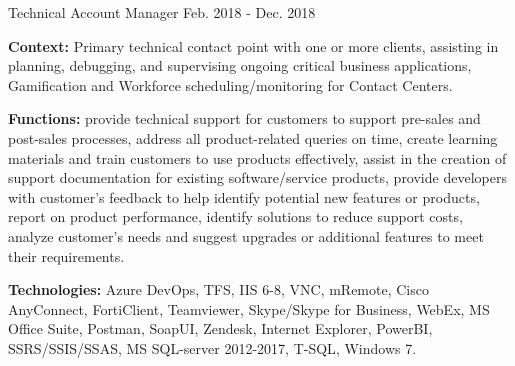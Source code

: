 \begin{cventries}
  \cventry
    {Technical Account Manager} %
    {} %
    {} %
    {Feb. 2018 - Dec. 2018} %
    {
      \begin{cvitems} %
		\item[] {\textbf{Context:} Primary technical contact point with one or more clients, assisting in planning, debugging, and supervising ongoing critical business applications, Gamification and Workforce scheduling/monitoring for Contact Centers.}
		\item[] {\textbf{Functions:} provide technical support for customers to support pre-sales and post-sales processes, address all product-related queries on time, create learning materials and train customers to use products effectively, assist in the creation of support documentation for existing software/service products, provide developers with customer's feedback to help identify potential new features or products, report on product performance, identify solutions to reduce support costs, analyze customer's needs and suggest upgrades or additional features to meet their requirements.}		
		\item[] {\textbf{Technologies:} \textcolor{rainbowcolor-olive}{Azure DevOps}, \textcolor{rainbowcolor-olive}{TFS}, \textcolor{rainbowcolor-olive}{IIS 6-8}, \textcolor{rainbowcolor-olive}{VNC}, \textcolor{rainbowcolor-olive}{mRemote}, \textcolor{rainbowcolor-olive}{Cisco AnyConnect}, %
\textcolor{rainbowcolor-olive}{FortiClient}, \textcolor{rainbowcolor-olive}{Teamviewer}, \textcolor{rainbowcolor-olive}{Skype/Skype for Business}, \textcolor{rainbowcolor-olive}{WebEx}, \textcolor{rainbowcolor-olive}{MS Office Suite}, \textcolor{rainbowcolor-olive}{Postman}, \textcolor{rainbowcolor-olive}{SoapUI}, \textcolor{rainbowcolor-olive}{Zendesk}, \textcolor{rainbowcolor-olive}{Internet Explorer}, \textcolor{rainbowcolor-olive}{PowerBI}, \textcolor{rainbowcolor-olive}{SSRS/SSIS/SSAS}, \textcolor{rainbowcolor-olive}{MS SQL-server 2012-2017},  \textcolor{rainbowcolor-indigo}{T-SQL}, \textcolor{rainbowcolor-orange}{Windows 7}.}		
      \end{cvitems}
    } 
    

\end{cventries}
